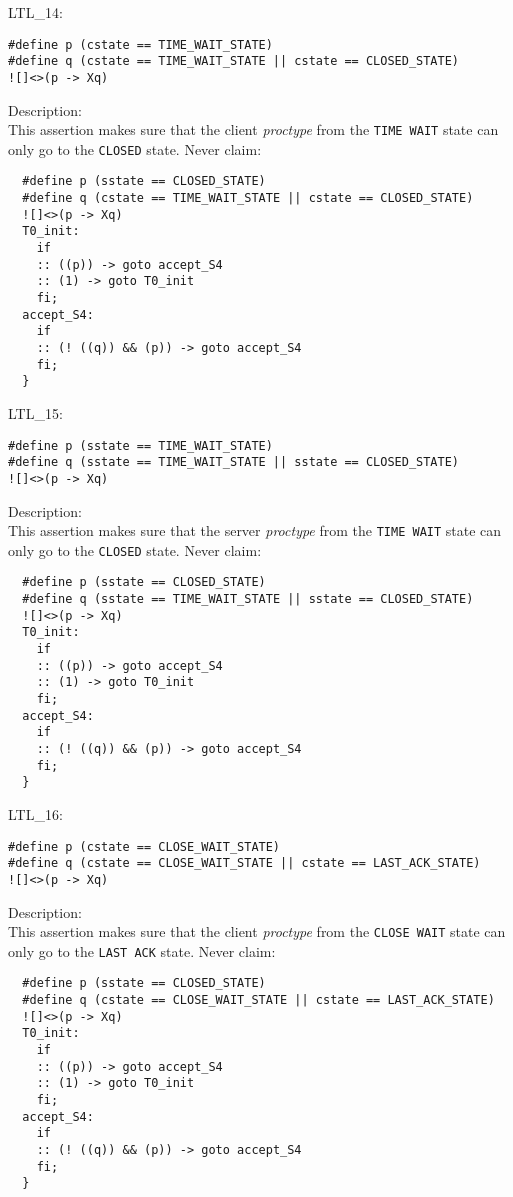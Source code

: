 \documentclass{WigReport}
\begin{document}
LTL\_14:\\
\begin{lstlisting}
#define p (cstate == TIME_WAIT_STATE)
#define q (cstate == TIME_WAIT_STATE || cstate == CLOSED_STATE)
![]<>(p -> Xq)
\end{lstlisting}
Description:\\
This assertion makes sure that the client \textit{proctype} from the \verb|TIME WAIT| state can only go to the \verb|CLOSED| state.
Never claim:\\
\begin{lstlisting}
  #define p (sstate == CLOSED_STATE)
  #define q (cstate == TIME_WAIT_STATE || cstate == CLOSED_STATE)
  ![]<>(p -> Xq)
  T0_init:
    if
    :: ((p)) -> goto accept_S4
    :: (1) -> goto T0_init
    fi;
  accept_S4:
    if
    :: (! ((q)) && (p)) -> goto accept_S4
    fi;
  }
\end{lstlisting}


LTL\_15:\\
\begin{lstlisting}
#define p (sstate == TIME_WAIT_STATE)
#define q (sstate == TIME_WAIT_STATE || sstate == CLOSED_STATE)
![]<>(p -> Xq)
\end{lstlisting}
Description:\\
This assertion makes sure that the server \textit{proctype} from the \verb|TIME WAIT| state can only go to the \verb|CLOSED| state.
Never claim:\\
\begin{lstlisting}
  #define p (sstate == CLOSED_STATE)
  #define q (sstate == TIME_WAIT_STATE || sstate == CLOSED_STATE)
  ![]<>(p -> Xq)
  T0_init:
    if
    :: ((p)) -> goto accept_S4
    :: (1) -> goto T0_init
    fi;
  accept_S4:
    if
    :: (! ((q)) && (p)) -> goto accept_S4
    fi;
  }
\end{lstlisting}


LTL\_16:\\
\begin{lstlisting}
#define p (cstate == CLOSE_WAIT_STATE)
#define q (cstate == CLOSE_WAIT_STATE || cstate == LAST_ACK_STATE)
![]<>(p -> Xq)
\end{lstlisting}
Description:\\
This assertion makes sure that the client \textit{proctype} from the \verb|CLOSE WAIT| state can only go to the \verb|LAST ACK| state.
Never claim:\\
\begin{lstlisting}
  #define p (sstate == CLOSED_STATE)
  #define q (cstate == CLOSE_WAIT_STATE || cstate == LAST_ACK_STATE)
  ![]<>(p -> Xq)
  T0_init:
    if
    :: ((p)) -> goto accept_S4
    :: (1) -> goto T0_init
    fi;
  accept_S4:
    if
    :: (! ((q)) && (p)) -> goto accept_S4
    fi;
  }
\end{lstlisting}
\end{document}
